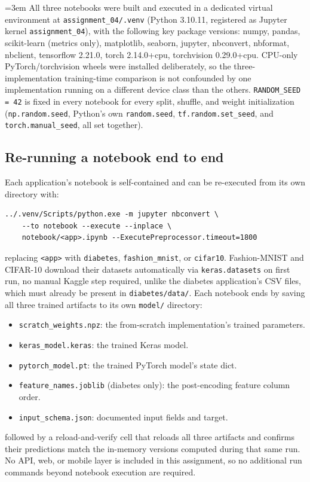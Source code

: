 \documentclass[11pt]{article}
\newcommand{\code}[1]{\texttt{#1}}
\begin{document}
\begingroup\sloppy\emergencystretch=3em
All three notebooks were built and executed in a dedicated virtual environment
at \texttt{assignment\_04/.venv} (Python 3.10.11, registered as Jupyter kernel
\texttt{assignment\_04}), with the following key package versions: numpy,
pandas, scikit-learn (metrics only), matplotlib, seaborn, jupyter, nbconvert,
nbformat, nbclient, tensorflow 2.21.0, torch 2.14.0+cpu, torchvision
0.29.0+cpu. CPU-only PyTorch/torchvision wheels were installed deliberately,
so the three-implementation training-time comparison is not confounded by one
implementation running on a different device class than the others.
\code{RANDOM\_SEED = 42} is fixed in every notebook for every split, shuffle,
and weight initialization (\code{np.random.seed}, Python's own
\code{random.seed}, \code{tf.random.set\_seed}, and
\code{torch.manual\_seed}, all set together).
\par\endgroup

\subsection{Re-running a notebook end to end}

Each application's notebook is self-contained and can be re-executed from its
own directory with:
\begin{footnotesize}
\begin{verbatim}
../.venv/Scripts/python.exe -m jupyter nbconvert \
    --to notebook --execute --inplace \
    notebook/<app>.ipynb --ExecutePreprocessor.timeout=1800
\end{verbatim}
\end{footnotesize}
replacing \texttt{<app>} with \texttt{diabetes}, \texttt{fashion\_mnist}, or
\texttt{cifar10}. Fashion-MNIST and CIFAR-10 download their datasets
automatically via \code{keras.datasets} on first run, no manual Kaggle step
required, unlike the diabetes application's CSV files, which must already be
present in \texttt{diabetes/data/}. Each notebook ends by saving all three
trained artifacts to its own \texttt{model/} directory:
\begin{itemize}[nosep]
  \item \texttt{scratch\_weights.npz}: the from-scratch implementation's
    trained parameters.
  \item \texttt{keras\_model.keras}: the trained Keras model.
  \item \texttt{pytorch\_model.pt}: the trained PyTorch model's state dict.
  \item \texttt{feature\_names.joblib} (diabetes only): the post-encoding
    feature column order.
  \item \texttt{input\_schema.json}: documented input fields and target.
\end{itemize}
followed by a reload-and-verify cell that reloads all three artifacts and
confirms their predictions match the in-memory versions computed during that
same run. No API, web, or mobile layer is included in this assignment, so no
additional run commands beyond notebook execution are required.
\end{document}
